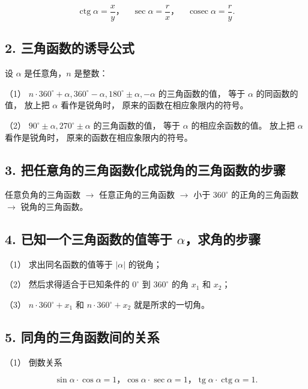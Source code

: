 \[
\operatorname{ctg} \alpha = \frac {x}{y}\text{，} \quad \sec \alpha = \frac {r}{x}\text{，} \quad \operatorname{cosec} \alpha = \frac {r}{y}.
\]

\subsection{2. 三角函数的诱导公式}

设 \(\alpha\) 是任意角，\(n\) 是整数：

（1）
\(n \cdot 360^{\circ} + \alpha, 360^{\circ} - \alpha, 180^{\circ} \pm \alpha, -\alpha\)
的三角函数的值， 等于 \(\alpha\) 的同函数的值， 放上把 \(\alpha\)
看作是锐角时， 原来的函数在相应象限内的符号。

（2） \(90^{\circ} \pm \alpha, 270^{\circ} \pm \alpha\) 的三角函数的值，
等于 \(\alpha\) 的相应余函数的值。 放上把 \(\alpha\) 看作是锐角时，
原来的函数在相应象限内的符号。

\subsection{3. 把任意角的三角函数化成锐角的三角函数的步骤}

任意负角的三角函数 \(\rightarrow\) 任意正角的三角函数 \(\rightarrow\)
小于 \(360^{\circ}\) 的正角的三角函数 \(\rightarrow\) 锐角的三角函数。

\subsection{\texorpdfstring{4. 已知一个三角函数的值等于 \(\alpha\)，求角的步骤}{4. 已知一个三角函数的值等于 \textbackslash alpha，求角的步骤}}

（1） 求出同名函数的值等于 \(|\alpha|\) 的锐角；

（2） 然后求得适合于已知条件的 \(0^{\circ}\) 到 \(360^{\circ}\) 的角
\(x_{1}\) 和 \(x_{2}\)；

（3） \(n \cdot 360^{\circ} + x_{1}\) 和 \(n \cdot 360^{\circ} + x_{2}\)
就是所求的一切角。

\subsection{5. 同角的三角函数间的关系}

（1） 倒数关系

\[
\sin \alpha \cdot \cos \alpha = 1\text{，} \cos \alpha \cdot \sec \alpha = 1\text{，} \operatorname{tg} \alpha \cdot \operatorname{ctg} \alpha = 1.
\]

